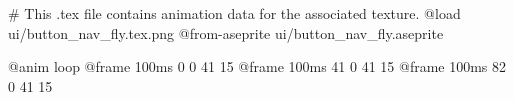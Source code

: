 # This .tex file contains animation data for the associated texture.
@load ui/button_nav_fly.tex.png
@from-aseprite ui/button_nav_fly.aseprite

@anim loop
	@frame 100ms 0 0 41 15
	@frame 100ms 41 0 41 15
	@frame 100ms 82 0 41 15
